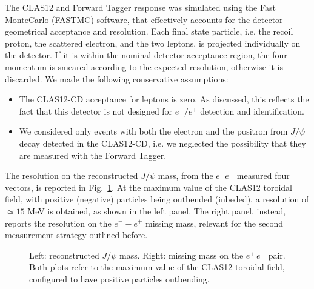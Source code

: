 The CLAS12 and Forward Tagger response was simulated using the Fast MonteCarlo (FASTMC) software, that effectively accounts for the detector geometrical acceptance and resolution. Each final state particle, i.e. the recoil
proton, the scattered electron, and the two leptons, is projected individually on the detector. If it is within the nominal detector acceptance region, the four-momentum is smeared according to the expected resolution, otherwise it is discarded. We made the following conservative assumptions:
\begin{itemize}
\item{The CLAS12-CD acceptance for leptons is zero. As discussed, this reflects the fact that this detector is not designed for $e^- / e^+$ detection and identification.}
\item{We considered only events with both the electron and the positron from $J/\psi$ decay detected in the CLAS12-CD, i.e. we neglected the possibility that they are measured with the Forward Tagger.}
\end{itemize}

The resolution on the reconstructed $J/\psi$ mass, from the $e^{+} e^{-}$ measured four vectors, is reported in Fig.~\ref{fig:3}. At the maximum value of the CLAS12 toroidal field, with positive (negative) particles being outbended (inbeded), a resolution of $\simeq 15$ MeV is obtained, as shown in the left panel. The right panel, instead, reports the resolution on the $e^- - e^+$ missing mass, relevant for the second measurement strategy outlined before.

\begin{figure}[tpb]
\caption{\footnotesize \label{fig:3} Left: reconstructed $J/\psi$ mass. Right: missing mass on the $e^+\,e^-$ pair. Both plots refer to the maximum value of the CLAS12 toroidal field, configured to have positive particles outbending.}
\end{figure}

